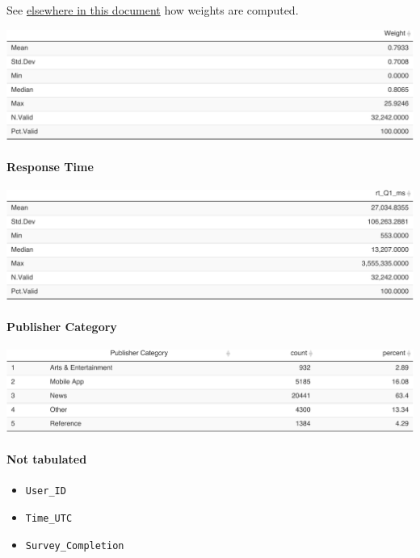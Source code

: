\documentclass[
]{article}
\providecommand{\tightlist}{%
  \setlength{\itemsep}{0pt}\setlength{\parskip}{0pt}}
\begin{document}
See \protect\hyperlink{weighting}{elsewhere in this document} how
weights are computed.

\includegraphics{expectations-codebook_files/figure-latex/details_weights-1.pdf}

\hypertarget{response-time}{%
\paragraph{Response Time}\label{response-time}}

\includegraphics{expectations-codebook_files/figure-latex/details_responsetime-1.pdf}

\hypertarget{publisher-category}{%
\paragraph{Publisher Category}\label{publisher-category}}

\includegraphics{expectations-codebook_files/figure-latex/details_publisher-1.pdf}

\hypertarget{not-tabulated}{%
\paragraph{Not tabulated}\label{not-tabulated}}

\begin{itemize}
\tightlist
\item
  \texttt{User\_ID}
\item
  \texttt{Time\_UTC}
\item
  \texttt{Survey\_Completion}
\end{itemize}
\end{document}
